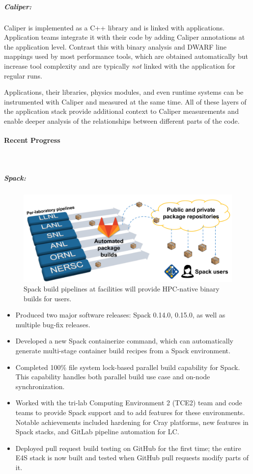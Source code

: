 \subparagraph{Caliper:}
Caliper is implemented as a C++ library and is linked with applications.
Application teams integrate it with their code by adding Caliper
annotations at the application level.  Contrast this with binary analysis
and DWARF line mappings used by most performance tools, which are
obtained automatically but increase tool complexity and are typically
{\it not} linked with the application for regular runs.

Applications, their libraries, physics modules, and even runtime systems
can be instrumented with Caliper and measured at the same time.  All of
these layers of the application stack provide additional context to
Caliper measurements and enable deeper analysis of the relationships
between different parts of the code.



\paragraph{Recent Progress} \leavevmode \\


\subparagraph{Spack:}
\begin{figure}[tb]
\centering
\includegraphics[width=.75\textwidth]{projects/2.3.6-NNSA/2.3.6.02-LLNL-ATDM/spack-pipelines.pdf}
\caption{Spack build pipelines at facilities will provide HPC-native binary builds for users.}
\end{figure}


\begin{itemize}
\item Produced two major software releases: Spack 0.14.0, 0.15.0, as well as multiple bug-fix releases.
\item Developed a new Spack containerize command, which can automatically generate multi-stage container build recipes from a Spack environment.
\item Completed 100\% file system lock-based parallel build capability for Spack. This capability handles both parallel build use case and on-node synchronization.
\item Worked with the tri-lab Computing Environment 2 (TCE2) team and code teams to provide Spack support and to add features for these environments. Notable achievements included hardening for Cray platforms, new features in Spack stacks, and GitLab pipeline automation for LC.
\item Deployed pull request build testing on GitHub for the first time; the entire E4S stack is now built and tested when GitHub pull requests modify parts of it.
\end{itemize}

